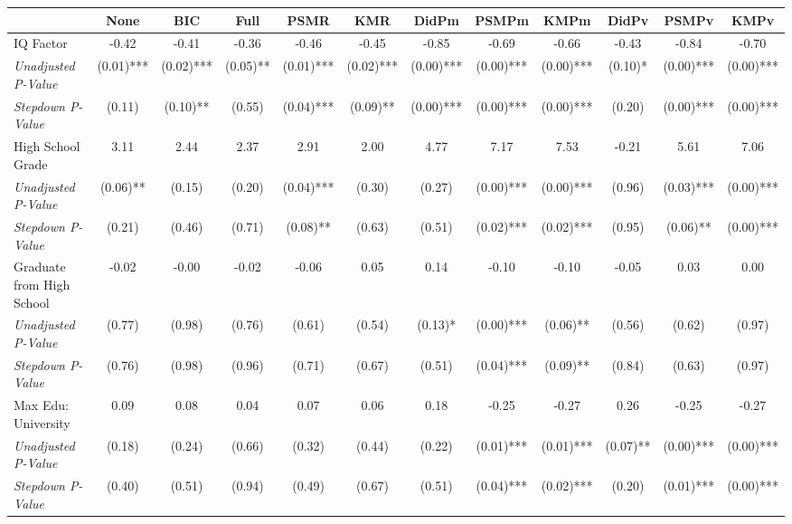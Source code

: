 \begin{tabular}{l c c c c c c c c c c c}
\toprule
 & None & BIC & Full & PSMR & KMR & DidPm & PSMPm & KMPm & DidPv & PSMPv & KMPv \\
\midrule
IQ Factor & -0.42 & -0.41 & -0.36 & -0.46 & -0.45 & -0.85 & -0.69 & -0.66 & -0.43 & -0.84 & -0.70 \\
\quad \textit{Unadjusted P-Value} & (0.01)*** & (0.02)*** & (0.05)** & (0.01)*** & (0.02)*** & (0.00)*** & (0.00)*** & (0.00)*** & (0.10)* & (0.00)*** & (0.00)*** \\
\quad \textit{Stepdown P-Value} & (0.11) & (0.10)** & (0.55) & (0.04)*** & (0.09)** & (0.00)*** & (0.00)*** & (0.00)*** & (0.20) & (0.00)*** & (0.00)*** \\
High School Grade & 3.11 & 2.44 & 2.37 & 2.91 & 2.00 & 4.77 & 7.17 & 7.53 & -0.21 & 5.61 & 7.06 \\
\quad \textit{Unadjusted P-Value} & (0.06)** & (0.15) & (0.20) & (0.04)*** & (0.30) & (0.27) & (0.00)*** & (0.00)*** & (0.96) & (0.03)*** & (0.00)*** \\
\quad \textit{Stepdown P-Value} & (0.21) & (0.46) & (0.71) & (0.08)** & (0.63) & (0.51) & (0.02)*** & (0.02)*** & (0.95) & (0.06)** & (0.00)*** \\
Graduate from High School & -0.02 & -0.00 & -0.02 & -0.06 & 0.05 & 0.14 & -0.10 & -0.10 & -0.05 & 0.03 & 0.00 \\
\quad \textit{Unadjusted P-Value} & (0.77) & (0.98) & (0.76) & (0.61) & (0.54) & (0.13)* & (0.00)*** & (0.06)** & (0.56) & (0.62) & (0.97) \\
\quad \textit{Stepdown P-Value} & (0.76) & (0.98) & (0.96) & (0.71) & (0.67) & (0.51) & (0.04)*** & (0.09)** & (0.84) & (0.63) & (0.97) \\
Max Edu: University & 0.09 & 0.08 & 0.04 & 0.07 & 0.06 & 0.18 & -0.25 & -0.27 & 0.26 & -0.25 & -0.27 \\
\quad \textit{Unadjusted P-Value} & (0.18) & (0.24) & (0.66) & (0.32) & (0.44) & (0.22) & (0.01)*** & (0.01)*** & (0.07)** & (0.00)*** & (0.00)*** \\
\quad \textit{Stepdown P-Value} & (0.40) & (0.51) & (0.94) & (0.49) & (0.67) & (0.51) & (0.04)*** & (0.02)*** & (0.20) & (0.01)*** & (0.00)*** \\
\bottomrule
\end{tabular}
